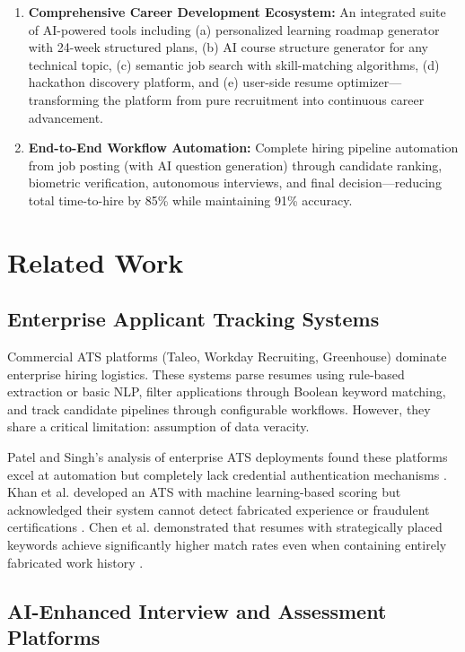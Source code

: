 \documentclass[conference]{IEEEtran}
\begin{document}
\begin{enumerate}
    \item \textbf{Comprehensive Career Development Ecosystem:} An integrated suite of AI-powered tools including (a) personalized learning roadmap generator with 24-week structured plans, (b) AI course structure generator for any technical topic, (c) semantic job search with skill-matching algorithms, (d) hackathon discovery platform, and (e) user-side resume optimizer—transforming the platform from pure recruitment into continuous career advancement.
    
    \item \textbf{End-to-End Workflow Automation:} Complete hiring pipeline automation from job posting (with AI question generation) through candidate ranking, biometric verification, autonomous interviews, and final decision—reducing total time-to-hire by 85\% while maintaining 91\% accuracy.
\end{enumerate}

\section{Related Work}

\subsection{Enterprise Applicant Tracking Systems}

Commercial ATS platforms (Taleo, Workday Recruiting, Greenhouse) dominate enterprise hiring logistics. These systems parse resumes using rule-based extraction or basic NLP, filter applications through Boolean keyword matching, and track candidate pipelines through configurable workflows. However, they share a critical limitation: assumption of data veracity.

Patel and Singh's analysis of enterprise ATS deployments found these platforms excel at automation but completely lack credential authentication mechanisms \cite{patel2022enhancing}. Khan et al. developed an ATS with machine learning-based scoring but acknowledged their system cannot detect fabricated experience or fraudulent certifications \cite{khan2022applicant}. Chen et al. demonstrated that resumes with strategically placed keywords achieve significantly higher match rates even when containing entirely fabricated work history \cite{chen2023multimodal}.

\subsection{AI-Enhanced Interview and Assessment Platforms}
\end{document}
